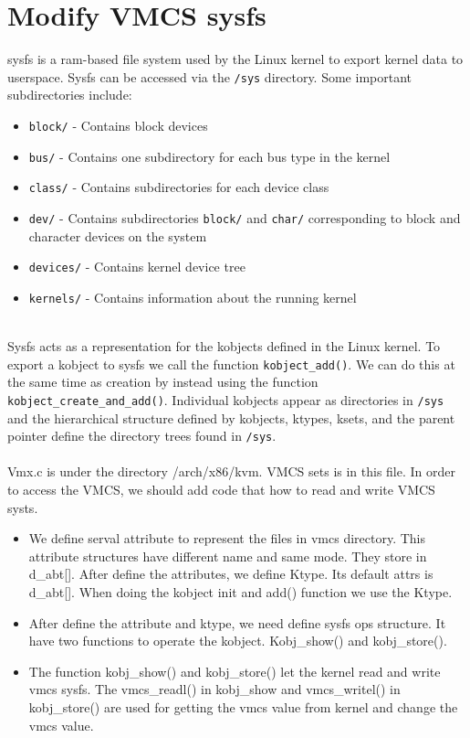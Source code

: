 \documentclass[onecolumn, draftclsnofoot,10pt, compsoc]{IEEEtran}
\begin{document}
\section{Modify VMCS sysfs}
sysfs is a ram-based file system used by the Linux kernel to export kernel data to userspace.
Sysfs can be accessed via the \texttt{/sys} directory.
Some important subdirectories include:
\begin{itemize}
    \item \texttt{block/} - Contains block devices
    \item \texttt{bus/} - Contains one subdirectory for each bus type in the kernel
    \item \texttt{class/} - Contains subdirectories for each device class
    \item \texttt{dev/} - Contains subdirectories \texttt{block/} and \texttt{char/} corresponding to block and character devices on the system
    \item \texttt{devices/} - Contains kernel device tree
    \item \texttt{kernels/} - Contains information about the running kernel
\end{itemize}
\ \\
Sysfs acts as a representation for the kobjects defined in the Linux kernel. To export a kobject to sysfs we call the function \texttt{kobject\_add()}. We can do this at the same time as creation by instead using the function \texttt{kobject\_create\_and\_add()}.
Individual kobjects appear as directories in \texttt{/sys} and the hierarchical structure defined by kobjects, ktypes, ksets, and the parent pointer define the directory trees found in \texttt{/sys}.
\ \\ \ \\
    Vmx.c is under the directory /arch/x86/kvm. VMCS sets is in this file. In order to access the VMCS, we should add code that how to read and write VMCS systs.
    \begin{itemize}
      \item We define serval attribute to represent the files in vmcs directory. This attribute structures have different name and same mode. They store in d\_abt[]. After define the attributes, we define Ktype. Its default attrs is d\_abt[]. When doing the kobject init and add() function we use the Ktype.
      \item After define the attribute and ktype, we need define sysfs ops structure. It have two functions to operate the kobject. Kobj\_show() and kobj\_store().
      \item The function kobj\_show() and kobj\_store() let the kernel read and write vmcs sysfs. The vmcs\_readl() in kobj\_show and vmcs\_writel() in kobj\_store() are used for getting the vmcs value from kernel and change the vmcs value.
    \end{itemize}
\end{document}
